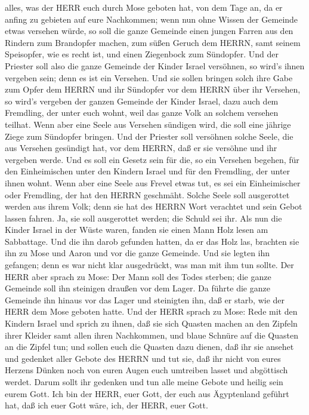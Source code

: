alles, was der HERR euch durch Mose geboten hat, von dem Tage an, da er
anfing zu gebieten auf eure Nachkommen;  wenn nun ohne
Wissen der Gemeinde etwas versehen würde, so soll die ganze Gemeinde
einen jungen Farren aus den Rindern zum Brandopfer machen, zum süßen
Geruch dem HERRN, samt seinem Speisopfer, wie es recht ist, und einen
Ziegenbock zum Sündopfer.  Und der Priester soll also die
ganze Gemeinde der Kinder Israel versöhnen, so wird's ihnen vergeben
sein; denn es ist ein Versehen. Und sie sollen bringen solch ihre Gabe
zum Opfer dem HERRN und ihr Sündopfer vor dem HERRN über ihr Versehen,
 so wird's vergeben der ganzen Gemeinde der Kinder Israel,
dazu auch dem Fremdling, der unter euch wohnt, weil das ganze Volk an
solchem versehen teilhat.  Wenn aber eine Seele aus
Versehen sündigen wird, die soll eine jährige Ziege zum Sündopfer
bringen.  Und der Priester soll versöhnen solche Seele, die
aus Versehen gesündigt hat, vor dem HERRN, daß er sie versöhne und ihr
vergeben werde.  Und es soll ein Gesetz sein für die, so
ein Versehen begehen, für den Einheimischen unter den Kindern Israel und
für den Fremdling, der unter ihnen wohnt.  Wenn aber eine
Seele aus Frevel etwas tut, es sei ein Einheimischer oder Fremdling, der
hat den HERRN geschmäht. Solche Seele soll ausgerottet werden aus ihrem
Volk;  denn sie hat des HERRN Wort verachtet und sein Gebot
lassen fahren. Ja, sie soll ausgerottet werden; die Schuld sei ihr.
 Als nun die Kinder Israel in der Wüste waren, fanden sie
einen Mann Holz lesen am Sabbattage.  Und die ihn darob
gefunden hatten, da er das Holz las, brachten sie ihn zu Mose und Aaron
und vor die ganze Gemeinde.  Und sie legten ihn gefangen;
denn es war nicht klar ausgedrückt, was man mit ihm tun sollte.
 Der HERR aber sprach zu Mose: Der Mann soll des Todes
sterben; die ganze Gemeinde soll ihn steinigen draußen vor dem Lager.
 Da führte die ganze Gemeinde ihn hinaus vor das Lager und
steinigten ihn, daß er starb, wie der HERR dem Mose geboten hatte.
 Und der HERR sprach zu Mose:  Rede mit den
Kindern Israel und sprich zu ihnen, daß sie sich Quasten machen an den
Zipfeln ihrer Kleider samt allen ihren Nachkommen, und blaue Schnüre auf
die Quasten an die Zipfel tun;  und sollen euch die Quasten
dazu dienen, daß ihr sie ansehet und gedenket aller Gebote des HERRN und
tut sie, daß ihr nicht von eures Herzens Dünken noch von euren Augen
euch umtreiben lasset und abgöttisch werdet.  Darum sollt
ihr gedenken und tun alle meine Gebote und heilig sein eurem Gott.
 Ich bin der HERR, euer Gott, der euch aus Ägyptenland
geführt hat, daß ich euer Gott wäre, ich, der HERR, euer Gott.

